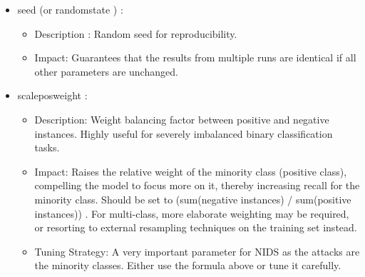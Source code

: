 \begin{itemize}[noitemsep]
\item seed (or random\textunderscore state ) : 
\begin{itemize}[noitemsep] 
\item Description : Random seed for reproducibility. 
\item Impact: Guarantees that the results from multiple runs are identical if all other parameters are unchanged.
\end{itemize} 

\item scale\textunderscore pos\textunderscore weight : 
\begin{itemize}[noitemsep] 
\item Description: Weight balancing factor between positive and negative instances. Highly useful for severely imbalanced binary classification tasks.
\item Impact: Raises the relative weight of the minority class (positive class), compelling the model to focus more on it, thereby increasing recall for the minority class. Should be set to (sum(negative instances) / sum(positive instances)) \parencite{habeeb2024two}. For multi-class, more elaborate weighting may be required, or resorting to external resampling techniques on the training set instead.
\item Tuning Strategy: A very important parameter for NIDS as the attacks are the minority classes. Either use the formula above or tune it carefully.
\end{itemize} 
\end{itemize} 

